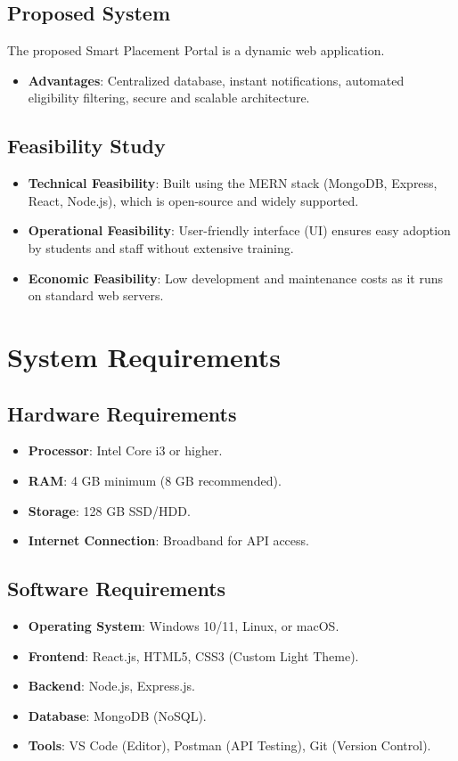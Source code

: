\documentclass[12pt, a4paper]{report}
\begin{document}
\section{Proposed System}
The proposed Smart Placement Portal is a dynamic web application.
\begin{itemize}
    \item \textbf{Advantages}: Centralized database, instant notifications, automated eligibility filtering, secure and scalable architecture.
\end{itemize}

\section{Feasibility Study}
\begin{itemize}
    \item \textbf{Technical Feasibility}: Built using the MERN stack (MongoDB, Express, React, Node.js), which is open-source and widely supported.
    \item \textbf{Operational Feasibility}: User-friendly interface (UI) ensures easy adoption by students and staff without extensive training.
    \item \textbf{Economic Feasibility}: Low development and maintenance costs as it runs on standard web servers.
\end{itemize}

\chapter{System Requirements}

\section{Hardware Requirements}
\begin{itemize}
    \item \textbf{Processor}: Intel Core i3 or higher.
    \item \textbf{RAM}: 4 GB minimum (8 GB recommended).
    \item \textbf{Storage}: 128 GB SSD/HDD.
    \item \textbf{Internet Connection}: Broadband for API access.
\end{itemize}

\section{Software Requirements}
\begin{itemize}
    \item \textbf{Operating System}: Windows 10/11, Linux, or macOS.
    \item \textbf{Frontend}: React.js, HTML5, CSS3 (Custom Light Theme).
    \item \textbf{Backend}: Node.js, Express.js.
    \item \textbf{Database}: MongoDB (NoSQL).
    \item \textbf{Tools}: VS Code (Editor), Postman (API Testing), Git (Version Control).
\end{itemize}
\end{document}
